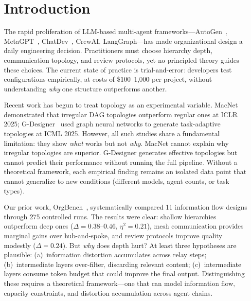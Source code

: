 \documentclass[conference]{IEEEtran}
\begin{document}
\section{Introduction}
\label{sec:intro}


The rapid proliferation of LLM-based multi-agent frameworks---AutoGen~\cite{wu2023autogen}, MetaGPT~\cite{hong2023metagpt}, ChatDev~\cite{qian2024chatdev}, CrewAI, LangGraph---has made organizational design a daily engineering decision.
Practitioners must choose hierarchy depth, communication topology, and review protocols, yet no principled theory guides these choices.
The current state of practice is trial-and-error: developers test configurations empirically, at costs of \$100--1,000 per project, without understanding \emph{why} one structure outperforms another.


Recent work has begun to treat topology as an experimental variable.
MacNet~\cite{qian2025macnet} demonstrated that irregular DAG topologies outperform regular ones at ICLR 2025;
G-Designer~\cite{yao2025gdesigner} used graph neural networks to generate task-adaptive topologies at ICML 2025.
However, all such studies share a fundamental limitation:
they show \emph{what} works but not \emph{why}.
MacNet cannot explain why irregular topologies are superior.
G-Designer generates effective topologies but cannot predict their performance without running the full pipeline.
Without a theoretical framework, each empirical finding remains an isolated data point that cannot generalize to new conditions (different models, agent counts, or task types).


Our prior work, OrgBench~\cite{shinoda2026orgbench}, systematically compared 11 information flow designs through 275 controlled runs.
The results were clear: shallow hierarchies outperform deep ones ($\Delta = 0.38$--$0.46$, $\eta^2 = 0.21$), mesh communication provides marginal gains over hub-and-spoke, and review protocols improve quality modestly ($\Delta = 0.24$).
But \emph{why} does depth hurt?
At least three hypotheses are plausible:
(a)~information distortion accumulates across relay steps;
(b)~intermediate layers over-filter, discarding relevant content;
(c)~intermediate layers consume token budget that could improve the final output.
Distinguishing these requires a theoretical framework---one that can model information flow, capacity constraints, and distortion accumulation across agent chains.
\end{document}
